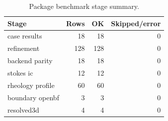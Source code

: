 \begin{table}[!htb]
    \centering
    \scriptsize
    \caption{Package benchmark stage summary.}
    \begin{tabular}{@{}lrrr@{}}
        \toprule
        Stage & Rows & OK & Skipped/error \\
        \midrule
        case results & 18 & 18 & 0 \\
        refinement & 128 & 128 & 0 \\
        backend parity & 18 & 18 & 0 \\
        stokes ic & 12 & 12 & 0 \\
        rheology profile & 60 & 60 & 0 \\
        boundary openbf & 3 & 3 & 0 \\
        resolved3d & 4 & 4 & 0 \\
        \bottomrule
    \end{tabular}
\end{table}
